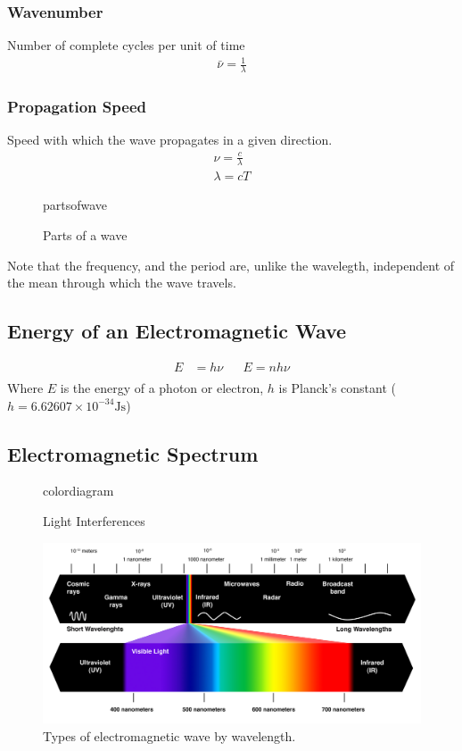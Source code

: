 \documentclass{article}[10pt]
\begin{document}
\subsubsection*{Wavenumber}
Number of complete cycles per unit of time
\begin{align*}
	\bar{\nu} = \frac{1}{\lambda}
\end{align*}

\subsubsection*{Propagation Speed}
Speed with which the wave propagates in a given direction.
\begin{align*}
	\nu = \frac{c}{\lambda} \\
	\lambda = cT
\end{align*}
\begin{figure}[H]
	\centering
	{partsofwave}
	\caption{Parts of a wave}\label{fig:partsofwave}
\end{figure}
Note that the frequency, and the period are, unlike the wavelegth, independent
of the mean through which the wave travels.
\clearpage
\subsection{Energy of an Electromagnetic Wave}
\begin{align*}
	E & = h\nu &   & E=nh\nu \\
\end{align*}
Where $E$ is the energy of a photon or electron, $h$ is Planck's constant
($h = 6.62607\times 10^{-34}\si{\joule\second}$)

\subsection{Electromagnetic Spectrum}
\begin{figure}[H]
	\centering
	{colordiagram}
	\caption{Light Interferences}\label{fig:colordiagram}
\end{figure}
\begin{figure}[H]
	\centering
	\includegraphics[scale=0.6]{radiations}
	\caption{Types of electromagnetic wave by wavelength.}\label{fig:radiations}
\end{figure}
\clearpage
\end{document}
